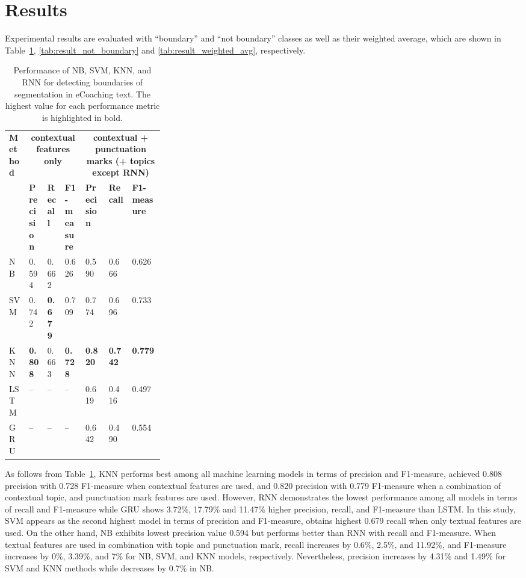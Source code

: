 \documentclass{amia}
\begin{document}
\section*{Results}
Experimental results are evaluated with ``boundary'' and ``not boundary'' classes as well as their weighted average, which are shown in Table~\ref{tab:result_boundary}, \ref{tab:result_not_boundary} and \ref{tab:result_weighted_avg}, respectively.\\

\begin{table}[ht]
\centering
\caption{Performance of NB, SVM, KNN, and RNN for detecting boundaries of segmentation in eCoaching text. The highest value for each performance metric is highlighted in bold.}
\label{tab:result_boundary}
  \begin{tabular}{|l|l|l|l|p{0.15\linewidth}|p{0.15\linewidth}|l|}
  \hline
   \multirow{2}{*}{\textbf{Method}} & \multicolumn{3}{|c|}{\textbf{contextual features only}} & \multicolumn{3}{|c|}{\textbf{contextual + punctuation marks (+ topics except RNN)}} \\\cline{2-7}
   & \textbf{Precision}  & \textbf{Recall} & \textbf{F1-measure} & \textbf{Precision}  & \textbf{Recall} & \textbf{F1-measure}\\ \hline    
    
 NB & 0.594 & 0.662 & 0.626 & 0.590 & 0.666 & 0.626 \\ \hline
 SVM & 0.742 & \textbf{0.679} & 0.709 & 0.774 & 0.696 & 0.733\\ \hline
 KNN & \textbf{0.808} & 0.663 & \textbf{0.728} & \textbf{0.820} & \textbf{0.742} & \textbf{0.779}\\ \hline
 LSTM & -- & -- & -- & 0.619 & 0.416 & 0.497  \\ \hline
 GRU & -- & -- & -- & 0.642 & 0.490 & 0.554 \\ \hline 
  \end{tabular}
\end{table}                 

As follows from Table~\ref{tab:result_boundary}, KNN performs best among all machine learning models in terms of precision and F1-measure, achieved 0.808 precision with 0.728 F1-measure when contextual features are used, and 0.820 precision with 0.779 F1-measure when a combination of contextual topic, and punctuation mark features are used. However, RNN demonstrates the lowest performance among all models in terms of recall and F1-measure while GRU shows 3.72\%, 17.79\% and 11.47\% higher precision, recall, and F1-measure than LSTM. In this study, SVM appears as the second highest model in terms of precision and F1-measure, obtains highest 0.679 recall when only textual features are used. On the other hand, NB exhibits lowest precision value 0.594 but performs better than RNN with recall and F1-measure. When textual features are used in combination with topic and punctuation mark, recall increases by 0.6\%, 2.5\%, and 11.92\%, and F1-measure increases by 0\%, 3.39\%, and 7\% for NB, SVM, and KNN models, respectively. Nevertheless, precision increases by 4.31\% and 1.49\% for SVM and KNN methods while decreases by 0.7\% in NB. \\
\end{document}

